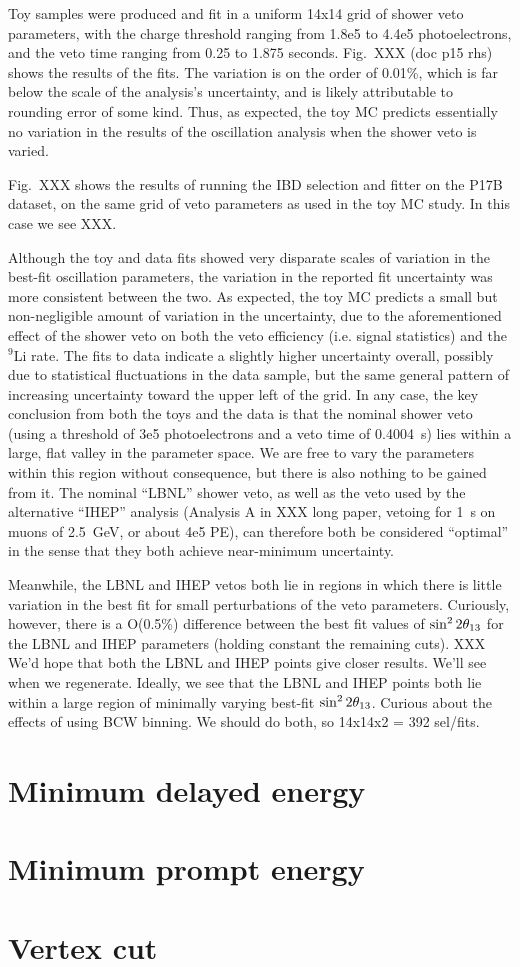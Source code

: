\documentclass[../thesis.tex]{subfiles}
\begin{document}
Toy samples were produced and fit in a uniform 14x14 grid of shower veto parameters, with the charge threshold ranging from 1.8e5 to 4.4e5 photoelectrons, and the veto time ranging from 0.25 to 1.875 seconds. Fig.~XXX (doc p15 rhs) shows the results of the fits. The variation is on the order of 0.01\%, which is far below the scale of the analysis's uncertainty, and is likely attributable to rounding error of some kind. Thus, as expected, the toy MC predicts essentially no variation in the results of the oscillation analysis when the shower veto is varied.

Fig.~XXX shows the results of running the IBD selection and fitter on the P17B dataset, on the same grid of veto parameters as used in the toy MC study. In this case we see XXX.

Although the toy and data fits showed very disparate scales of variation in the best-fit oscillation parameters, the variation in the reported fit uncertainty was more consistent between the two. As expected, the toy MC predicts a small but non-negligible amount of variation in the uncertainty, due to the aforementioned effect of the shower veto on both the veto efficiency (i.e. signal statistics) and the $^9$Li rate. The fits to data indicate a slightly higher uncertainty overall, possibly due to statistical fluctuations in the data sample, but the same general pattern of increasing uncertainty toward the upper left of the grid. In any case, the key conclusion from both the toys and the data is that the nominal shower veto (using a threshold of 3e5 photoelectrons and a veto time of 0.4004~s) lies within a large, flat valley in the parameter space. We are free to vary the parameters within this region without consequence, but there is also nothing to be gained from it. The nominal ``LBNL'' shower veto, as well as the veto used by the alternative ``IHEP'' analysis (Analysis A in XXX long paper, vetoing for 1~s on muons of 2.5~GeV, or about 4e5 PE), can therefore both be considered ``optimal'' in the sense that they both achieve near-minimum uncertainty.

Meanwhile, the LBNL and IHEP vetos both lie in regions in which there is little variation in the best fit for small perturbations of the veto parameters. Curiously, however, there is a O(0.5\%) difference between the best fit values of $\sin^2 2\theta_{13}$ for the LBNL and IHEP parameters (holding constant the remaining cuts). XXX We'd hope that both the LBNL and IHEP points give closer results. We'll see when we regenerate. Ideally, we see that the LBNL and IHEP points both lie within a large region of minimally varying best-fit $\sin^2 2\theta_{13}$. Curious about the effects of using BCW binning. We should do both, so 14x14x2 = 392 sel/fits.

\section{Minimum delayed energy}
\label{sec:cutVaryMinDelayed}

\section{Minimum prompt energy}
\label{sec:cutVaryMinPrompt}

\section{Vertex cut}
\label{sec:cutVaryVertexCut}
\end{document}
